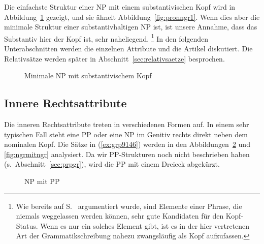 Die einfachste Struktur einer NP mit einem substantivischen Kopf wird in Abbildung~\ref{fig:ngreinf} gezeigt, und sie ähnelt Abbildung~\ref{fig:pronngr1}.
Wenn dies aber die minimale Struktur einer substantivhaltigen NP ist, ist unsere Annahme, dass das Substantiv hier der Kopf ist, sehr naheliegend.%
\footnote{Wie bereits auf S.~\pageref{abs:kopfnichtweglassbar} argumentiert wurde, sind Elemente einer Phrase, die niemals weggelassen werden können, sehr gute Kandidaten für den Kopf-Status.
Wenn es nur ein solches Element gibt, ist es in der hier vertretenen Art der Grammatikschreibung nahezu zwangsläufig als Kopf aufzufassen.}
In den folgenden Unterabschnitten werden die einzelnen Attribute und die Artikel diskutiert.
Die Relativsätze werden später in Abschnitt~\ref{sec:relativsaetze} besprochen.

\begin{figure}[!htbp]
  \centering
  \caption{Minimale NP mit substantivischem Kopf}
  \label{fig:ngreinf}
\end{figure}

\subsection{Innere Rechtsattribute}

\label{sec:innererechtsattribute}

Die inneren Rechtsattribute treten in verschiedenen Formen auf.
In einem sehr typischen Fall steht eine PP oder eine NP im Genitiv rechts direkt neben dem nominalen Kopf.
Die Sätze in (\ref{ex:grp9146}) werden in den Abbildungen~\ref{fig:ngrmitprpgr} und \ref{fig:ngrmitngr} analysiert.
Da wir PP-Strukturen noch nicht beschrieben haben (s.\ Abschnitt~\ref{sec:prpgr}), wird die PP mit einem Dreieck abgekürzt.

\begin{exe}
  \ex\label{ex:grp9146}
  \begin{xlist}
  \end{xlist}
\end{exe}

\begin{figure}[!htbp]
  \centering
  \caption{NP mit PP}
  \label{fig:ngrmitprpgr}
\end{figure}

